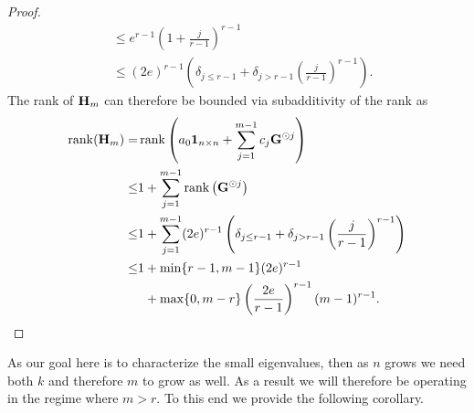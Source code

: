 \begin{proof}
\[\begin{aligned}
    & \leq  e^{r-1} \left(1 + \frac{j}{r-1} \right)^{r-1}\\
    & \leq (2e)^{r-1} \left(\delta_{j\leq r-1}  + \delta_{j > r-1} \left(\frac{j}{r-1}\right)^{r-1}\right). 
    \end{aligned}
    \]
    The rank of $\mathbf{H}_m$ can therefore be bounded via subadditivity of the rank as 
    \begin{equation}\label{eq:bound_Hm}
    \begin{aligned}
        \operatorname{rank}(\mathbf{H}_m) =& \operatorname{rank}\left(a_0 \textbf{1}_{n \times n} + \sum_{j=1}^{m-1} c_j \mathbf{G}^{\odot j} \right) \\
        \leq& 1+ \sum_{j=1}^{m-1} \operatorname{rank}\left( \mathbf{G}^{\odot j} \right)\\
         \leq& 1+ \sum_{j=1}^{m-1}(2e)^{r-1} \left(\delta_{j\leq r-1}  + \delta_{j > r-1} \left(\frac{j}{r-1}\right)^{r-1}\right)\\
         \leq& 1 + \min\{r-1, m-1 \}(2e)^{r-1} \\ 
        & \phantom{1}+ \max\{0, m-r\} \left(\frac{2e}{r-1}\right)^{r-1} (m-1)^{r-1} .
    \end{aligned}
    \end{equation}
\end{proof}

As our goal here is to characterize the small eigenvalues, then as $n$ grows we need both $k$ and therefore $m$ to grow as well. As a result we will therefore be operating in the regime where $m>r$. To this end we provide the following corollary.

